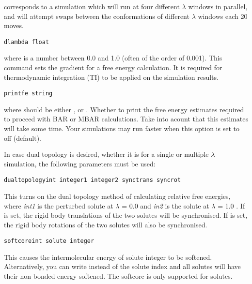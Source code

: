 \documentclass[letterpaper,10pt,english]{sphinxmanual}
\begin{document}
corresponds to a simulation which will run at four different \(\lambda\) windows in parallel, and will attempt swaps between the conformations of different \(\lambda\) windows each 20 moves.

\begin{Verbatim}[frame=single,commandchars=\\\{\}]
dlambda float
\end{Verbatim}

where  is a number between 0.0 and 1.0 (often of the order of 0.001). This command sets the gradient for a free energy calculation. It is required for thermodynamic integration (TI) to be applied on the simulation results.

\begin{Verbatim}[frame=single,commandchars=\\\{\}]
printfe string
\end{Verbatim}

where  should be either ,  or . Whether to print the free energy estimates required to proceed with BAR or MBAR calculations. Take into acount that this estimates will take some time. Your simulations may run faster when this option is set to off (default).

In case dual topology is desired, whether it is for a single or multiple \(\lambda\) simulation, the following parameters must be used:

\begin{Verbatim}[frame=single,commandchars=\\\{\}]
dualtopologyint integer1 integer2 synctrans syncrot
\end{Verbatim}

This turns on the dual topology method of calculating relative free energies, where \emph{int1} is the perturbed solute at \(\lambda\) = 0.0 and \emph{in2} is the solute at \(\lambda\) = 1.0 . If  is set, the rigid body translations of the two solutes will be synchronised. If  is set, the rigid body rotations of the two solutes will also be synchronised.

\begin{Verbatim}[frame=single,commandchars=\\\{\}]
softcoreint solute integer
\end{Verbatim}

This causes the intermolecular energy of solute integer to be softened. Alternatively, you can write  instead of the solute index and all solutes will have their non bonded energy softened. The softcore is only supported for solutes.
\end{document}
